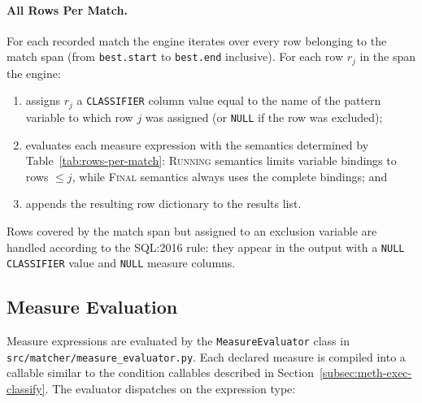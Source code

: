 \paragraph{All Rows Per Match.}
For each recorded match the engine iterates over every row
belonging to the match span (from \texttt{best.start} to
\texttt{best.end} inclusive).  For each row $r_j$ in the span
the engine:
\begin{enumerate}
  \item assigns $r_j$ a \texttt{CLASSIFIER} column value equal to
    the name of the pattern variable to which row $j$ was assigned
    (or \texttt{NULL} if the row was excluded);
  \item evaluates each measure expression with the semantics
    determined by Table~\ref{tab:rows-per-match}: \textsc{Running}
    semantics limits variable bindings to rows $\leq j$,
    while \textsc{Final} semantics always uses the complete
    bindings; and
  \item appends the resulting row dictionary to the results list.
\end{enumerate}
Rows covered by the match span but assigned to an exclusion
variable are handled according to the SQL:2016 rule: they appear
in the output with a \texttt{NULL} \texttt{CLASSIFIER} value and
\texttt{NULL} measure columns.

\subsection{Measure Evaluation}
\label{subsec:meth-exec-measures}

Measure expressions are evaluated by the
\texttt{MeasureEvaluator} class in
\texttt{src/matcher/measure\_evaluator.py}.  Each declared
measure is compiled into a callable similar to the condition
callables described in Section~\ref{subsec:meth-exec-classify}.
The evaluator dispatches on the expression type:

